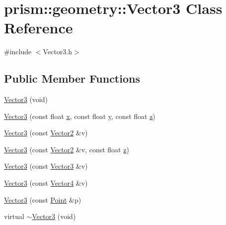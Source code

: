 \hypertarget{classprism_1_1geometry_1_1_vector3}{}\section{prism\+:\+:geometry\+:\+:Vector3 Class Reference}
\label{classprism_1_1geometry_1_1_vector3}


{\ttfamily \#include $<$Vector3.\+h$>$}

\subsection*{Public Member Functions}
\begin{DoxyCompactItemize}
\item 
\hyperlink{classprism_1_1geometry_1_1_vector3_ab8d2113bc4e2a85970bf3833ab5af2ee}{Vector3} (void)
\item 
\hyperlink{classprism_1_1geometry_1_1_vector3_a161de9c8f3d271600fd2351b9236efcc}{Vector3} (const float \hyperlink{classprism_1_1geometry_1_1_vector3_a626b13c89f5ba60b85f8e0b7898efddb}{x}, const float \hyperlink{classprism_1_1geometry_1_1_vector3_aee1ad3f7afd357faa521832508fd1611}{y}, const float \hyperlink{classprism_1_1geometry_1_1_vector3_aed8ff88f798babae79a5ccb706d0b761}{z})
\item 
\hyperlink{classprism_1_1geometry_1_1_vector3_aa0f674a2e41c89f176651b2a23097b34}{Vector3} (const \hyperlink{classprism_1_1geometry_1_1_vector2}{Vector2} \&v)
\item 
\hyperlink{classprism_1_1geometry_1_1_vector3_a664d659ec06cb82f8c2ead0ac2d6db11}{Vector3} (const \hyperlink{classprism_1_1geometry_1_1_vector2}{Vector2} \&v, const float \hyperlink{classprism_1_1geometry_1_1_vector3_aed8ff88f798babae79a5ccb706d0b761}{z})
\item 
\hyperlink{classprism_1_1geometry_1_1_vector3_a2af480eaee00aa6915c784d68288ccfb}{Vector3} (const \hyperlink{classprism_1_1geometry_1_1_vector3}{Vector3} \&v)
\item 
\hyperlink{classprism_1_1geometry_1_1_vector3_a59538c51b0e76f2a06fcce3f17eade3b}{Vector3} (const \hyperlink{classprism_1_1geometry_1_1_vector4}{Vector4} \&v)
\item 
\hyperlink{classprism_1_1geometry_1_1_vector3_ac3c40c86dab1faf60308aed3b5fde545}{Vector3} (const \hyperlink{classprism_1_1geometry_1_1_point}{Point} \&p)
\item 
virtual \hyperlink{classprism_1_1geometry_1_1_vector3_a3756b77b75ea81b67a3956a76acf1524}{$\sim$\+Vector3} (void)

\end{DoxyCompactItemize}
